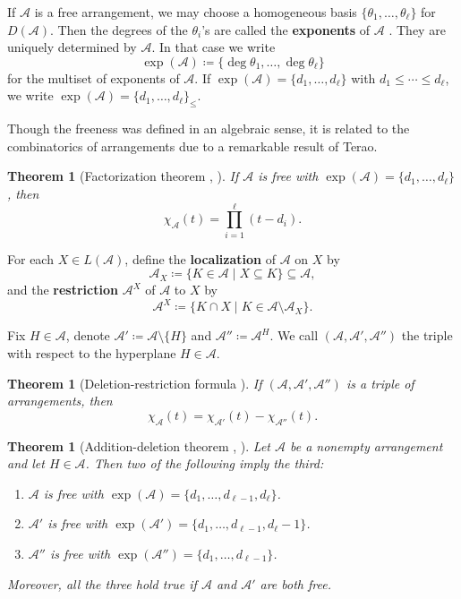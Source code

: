 \documentclass[11pt]{article}
\newtheorem{theorem}[theo]{Theorem}
\theoremstyle{definition}
\numberwithin{equation}{section}
\newcommand{\A}{\mathcal{A}}
\newcommand{\tbf}{\textbf}
\begin{document}
If $\A$ is a free arrangement, we may choose a homogeneous basis $\{\theta_1, \ldots, \theta_\ell\}$ for $D(\A)$.
Then the degrees of the $\theta_i$'s are called the \tbf{exponents} of $\A$ \cite[Definition 4.25]{OT92}. 
They are uniquely determined by $\A$. 
In that case we write 
\[
\exp(\A)  \coloneqq  \{\deg{\theta_1},\ldots,\deg{\theta_\ell}\}\]
for the multiset of exponents of $\A$. 
If $\exp(\A) = \{d_1, \ldots, d_\ell\}$ with $ d_1 \leq \cdots \leq d_\ell$, we write  $\exp(\A) = \{d_1,\ldots, d_\ell\}_\le$.

Though the freeness was defined in an algebraic sense, it is related to the combinatorics of arrangements due to a remarkable result of Terao. 

\begin{theorem}[Factorization theorem {\cite[Main Theorem]{T81}}, {\cite[Theorem 4.137]{OT92}}]\label{thm:Factorization}
If $\A$ is free with $\exp(\A) =\{d_{1}, \dots, d_{\ell}\} $, then 
$$\chi_\A(t)= \prod_{i=1}^\ell (t-d_i).$$
\end{theorem}

For each $X \in L(\A)$, define the \textbf{localization} of $\A$ on $X$  by 
$${\A}_X  \coloneqq \{ K \in {\A} \mid X \subseteq K\} \subseteq \A,$$
and the \textbf{restriction} ${\A}^{X}$ of ${\A}$ to $X$ by 
$${\A}^{X}  \coloneqq \{ K \cap X \mid K \in{\A }\setminus {\A}_X\}.$$

Fix $H \in \A$, denote $\A' \coloneqq \A\setminus \{H\}$ and $\A'' \coloneqq \A^H$. 
We call $(\A, \A', \A'')$ the triple with respect to the hyperplane $H \in\A$. 

 \begin{theorem}[Deletion-restriction formula  {\cite[Theorem 2.56]{OT92}}]
 \label{thm:DR}
 If $(\A, \A', \A'')$ is a triple of arrangements, then
 \begin{equation*}
\chi_{\A}(t)=
\chi_{\A'}(t)-
\chi_{\A''}(t). 
\end{equation*}
\end{theorem}

 \begin{theorem}[Addition-deletion theorem {\cite{T80}},  {\cite[Theorems 4.46 and 4.51]{OT92}}]
 \label{thm:AD}
Let $\A$ be a nonempty arrangement and let $H \in \A$. Then two of the following imply the third:
\begin{enumerate}[(1)]
\item $\A$ is free with $\exp(\A) = \{d_1, \ldots, d_{\ell-1}, d_\ell\}$.
\item  $\A'$ is free with $\exp(\A')=\{d_1, \ldots, d_{\ell-1}, d_\ell-1\}$. 
\item $\A''$ is free with $\exp(\A'') = \{d_1, \ldots, d_{\ell-1}\}$.
\end{enumerate}
Moreover, all the three hold true if $\A$ and $\A'$ are both free.
\end{theorem}
 
\end{document}

